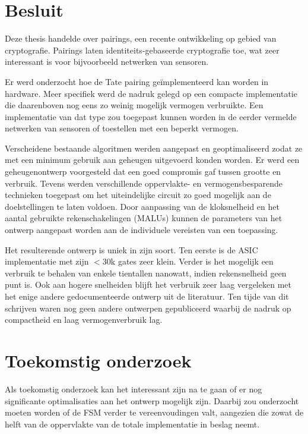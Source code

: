 
\section{Besluit}

Deze thesis handelde over pairings, een recente ontwikkeling op gebied van cryptografie. Pairings laten identiteits-gebaseerde cryptografie toe, wat zeer interessant is voor bijvoorbeeld netwerken van sensoren.

Er werd onderzocht hoe de Tate pairing ge\"implementeerd kan worden in hardware. Meer specifiek werd de nadruk gelegd op een compacte implementatie die daarenboven nog eens zo weinig mogelijk vermogen verbruikte. Een implementatie van dat type zou toegepast kunnen worden in de eerder vermelde netwerken van sensoren of toestellen met een beperkt vermogen.

Verscheidene bestaande algoritmen werden aangepast en geoptimaliseerd zodat ze met een minimum gebruik aan geheugen uitgevoerd konden worden. Er werd een geheugenontwerp voorgesteld dat een goed compromis gaf tussen grootte en verbruik. Tevens werden verschillende oppervlakte- en vermogensbesparende technieken toegepast om het uiteindelijke circuit zo goed mogelijk aan de doelstellingen te laten voldoen. Door aanpassing van de kloksnelheid en het aantal gebruikte rekenschakelingen (MALUs) kunnen de parameters van het ontwerp aangepast worden aan de individuele vereisten van een toepassing.

Het resulterende ontwerp is uniek in zijn soort. Ten eerste is de ASIC implementatie met zijn $<$30k gates zeer klein. Verder is het mogelijk een verbruik te behalen van enkele tientallen nanowatt, indien rekensnelheid geen punt is. Ook aan hogere snelheiden blijft het verbruik zeer laag vergeleken met het enige andere gedocumenteerde ontwerp uit de literatuur. Ten tijde van dit schrijven waren nog geen andere ontwerpen gepubliceerd waarbij de nadruk op compactheid en laag vermogenverbruik lag.

\section{Toekomstig onderzoek}

Als toekomstig onderzoek kan het interessant zijn na te gaan of er nog significante optimalisaties aan het ontwerp mogelijk zijn. Daarbij zou onderzocht moeten worden of de FSM verder te vereenvoudingen valt, aangezien die zowat de helft van de oppervlakte van de totale implementatie in beslag neemt.

